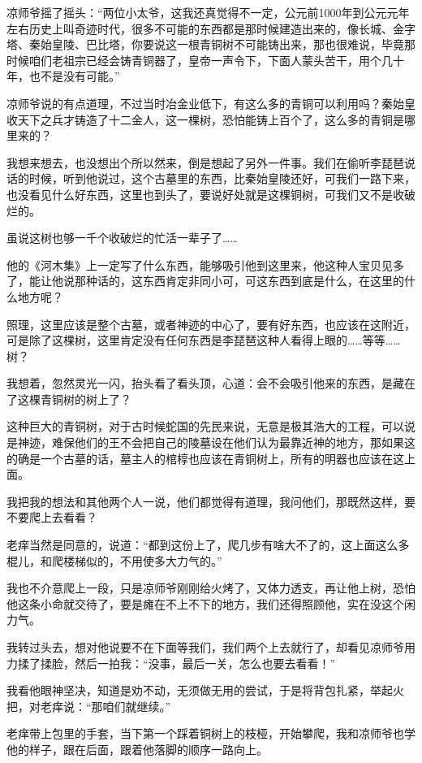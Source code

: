 凉师爷摇了摇头：“两位小太爷，这我还真觉得不一定，公元前1000年到公元元年左右历史上叫奇迹时代，很多不可能的东西都是那时候建造出来的，像长城、金字塔、秦始皇陵、巴比塔，你要说这一根青铜树不可能铸出来，那也很难说，毕竟那时候咱们老祖宗已经会铸青铜器了，皇帝一声令下，下面人蒙头苦干，用个几十年，也不是没有可能。”

凉师爷说的有点道理，不过当时冶金业低下，有这么多的青铜可以利用吗？秦始皇收天下之兵才铸造了十二金人，这一棵树，恐怕能铸上百个了，这么多的青铜是哪里来的？

我想来想去，也没想出个所以然来，倒是想起了另外一件事。我们在偷听李琵琶说话的时候，听到他说过，这个古墓里的东西，比秦始皇陵还好，可我们一路下来，也没看见什么好东西，这里也到头了，要说好处就是这棵铜树，可我们又不是收破烂的。

虽说这树也够一千个收破烂的忙活一辈子了……

他的《河木集》上一定写了什么东西，能够吸引他到这里来，他这种人宝贝见多了，能让他说那种话的，这东西肯定非同小可，可这东西到底是什么，在这里的什么地方呢？

照理，这里应该是整个古墓，或者神迹的中心了，要有好东西，也应该在这附近，可是除了这棵树，这里肯定没有任何东西是李琵琶这种人看得上眼的……等等……树？

我想着，忽然灵光一闪，抬头看了看头顶，心道：会不会吸引他来的东西，是藏在了这棵青铜树的树上了？

这种巨大的青铜树，对于古时候蛇国的先民来说，无意是极其浩大的工程，可以说是神迹，难保他们的王不会把自己的陵墓设在他们认为最靠近神的地方，那如果这的确是一个古墓的话，墓主人的棺椁也应该在青铜树上，所有的明器也应该在这上面。

我把我的想法和其他两个人一说，他们都觉得有道理，我问他们，那既然这样，要不要爬上去看看？

老痒当然是同意的，说道：“都到这份上了，爬几步有啥大不了的，这上面这么多棍儿，和爬楼梯似的，不用使多大力气的。”

我也不介意爬上一段，只是凉师爷刚刚给火烤了，又体力透支，再让他上树，恐怕他这条小命就交待了，要是瘫在不上不下的地方，我们还得照顾他，实在没这个闲力气。

我转过头去，想对他说要不在下面等我们，我们两个上去就行了，却看见凉师爷用力揉了揉脸，然后一拍我：“没事，最后一关，怎么也要去看看！”

我看他眼神坚决，知道是劝不动，无须做无用的尝试，于是将背包扎紧，举起火把，对老痒说：“那咱们就继续。”

老痒带上包里的手套，当下第一个踩着铜树上的枝桠，开始攀爬，我和凉师爷也学他的样子，跟在后面，跟着他落脚的顺序一路向上。

